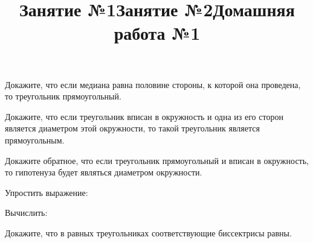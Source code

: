 \title{Занятие №1}
\begin{listofex}
	\item {}
	\item {}
	\item {}
	\item {}
	\item {}
	\item {}
	\item {}
	\item {}
	\item {}
\end{listofex}
\newpage
\title{Занятие №2}
\begin{listofex}
	\item Докажите, что если медиана равна половине стороны, к которой она проведена, то треугольник прямоугольный.
	\item {}
	\item Докажите, что если треугольник вписан в окружность и одна из его сторон является диаметром этой окружности, то такой треугольник является прямоугольным.
	\item Докажите обратное, что если треугольник прямоугольный и вписан в окружность, то гипотенуза будет являться диаметром окружности.
	\item {}
	\item {}
	\item {}
\end{listofex}
\newpage
\title{Домашняя работа №1}
\begin{listofex}
	\item Упростить выражение:
	\begin{enumcols}[itemcolumns=2]
		\item {}
		\item {}
	\end{enumcols}
	\item Вычислить:
	\begin{enumcols}[itemcolumns=2]
		\item {}
		\item {}
	\end{enumcols}
	\item Докажите, что в равных треугольниках соответствующие биссектрисы равны.
	\item {}
	\item {}
	\item {}
\end{listofex}
